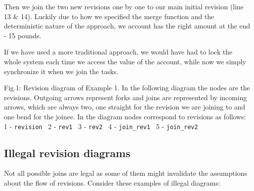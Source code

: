 \documentclass[12pt,twoside,notitlepage]{report}
\begin{document}
Then we join the two new revisions one by one to our main initial revision (line 13 \& 14). Luckily due to how we specified the merge function and the deterministic nature of the approach, we account has the right amount at the end - 15 pounds.

If we have used a more traditional approach, we would have had to lock the whole system each time we access the value of the account, while now we simply synchronize it when we join the tasks. 

 
Fig.1: Revision diagram of Example 1. In the following diagram the nodes are the revisions. Outgoing arrows represent forks and  joins are represented by incoming arrows, which are always two, one straight for the revision we are joining to and one bend for the joinee. In the diagram nodes correspond to revisions as follows: 1 - {\tt revision } 2 - {\tt rev1 } 3 - {\tt rev2 } 4 - {\tt join\_rev1 } 5 - {\tt join\_rev2}  

\subsection{Illegal revision diagrams}
Not all possible joins are legal as some of them might invalidate the assumptions about the flow of revisions. Consider these examples of illegal diagrams:
\end{document}
